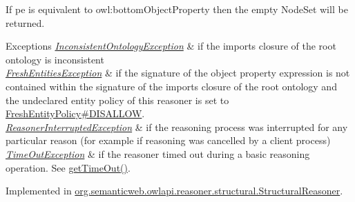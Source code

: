 If {\ttfamily pe} is equivalent to {\ttfamily owl\-:bottom\-Object\-Property} then the empty {\ttfamily Node\-Set} will be returned.


\begin{DoxyExceptions}{Exceptions}
{\em \hyperlink{classorg_1_1semanticweb_1_1owlapi_1_1reasoner_1_1_inconsistent_ontology_exception}{Inconsistent\-Ontology\-Exception}} & if the imports closure of the root ontology is inconsistent \\
\hline
{\em \hyperlink{classorg_1_1semanticweb_1_1owlapi_1_1reasoner_1_1_fresh_entities_exception}{Fresh\-Entities\-Exception}} & if the signature of the object property expression is not contained within the signature of the imports closure of the root ontology and the undeclared entity policy of this reasoner is set to \hyperlink{enumorg_1_1semanticweb_1_1owlapi_1_1reasoner_1_1_fresh_entity_policy_a762eae6d5b2449d125311ecaabfdc8d0}{Fresh\-Entity\-Policy\#\-D\-I\-S\-A\-L\-L\-O\-W}. \\
\hline
{\em \hyperlink{classorg_1_1semanticweb_1_1owlapi_1_1reasoner_1_1_reasoner_interrupted_exception}{Reasoner\-Interrupted\-Exception}} & if the reasoning process was interrupted for any particular reason (for example if reasoning was cancelled by a client process) \\
\hline
{\em \hyperlink{classorg_1_1semanticweb_1_1owlapi_1_1reasoner_1_1_time_out_exception}{Time\-Out\-Exception}} & if the reasoner timed out during a basic reasoning operation. See \hyperlink{interfaceorg_1_1semanticweb_1_1owlapi_1_1reasoner_1_1_o_w_l_reasoner_a44b2c968f989afe5290db29c90faa164}{get\-Time\-Out()}. \\
\hline
\end{DoxyExceptions}


Implemented in \hyperlink{classorg_1_1semanticweb_1_1owlapi_1_1reasoner_1_1structural_1_1_structural_reasoner_ae04701c3c9c671b10b2a1c9b6c941911}{org.\-semanticweb.\-owlapi.\-reasoner.\-structural.\-Structural\-Reasoner}.

